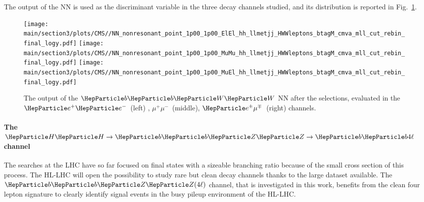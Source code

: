 The output of the NN is used as the discriminant variable in the three decay channels studied, and its distribution is reported in Fig.~\ref{sec3:CMSHH:fig:bbWW_events}.

\begin{figure}[!htb]
  \begin{center}
    \texttt{[image: \\main/section3/plots/CMS//NN\_nonresonant\_point\_1p00\_1p00\_ElEl\_hh\_llmetjj\_HWWleptons\_btagM\_cmva\_mll\_cut\_rebin\_final\_logy.pdf]}
    \texttt{[image: \\main/section3/plots/CMS//NN\_nonresonant\_point\_1p00\_1p00\_MuMu\_hh\_llmetjj\_HWWleptons\_btagM\_cmva\_mll\_cut\_rebin\_final\_logy.pdf]}
    \texttt{[image: \\main/section3/plots/CMS//NN\_nonresonant\_point\_1p00\_1p00\_MuEl\_hh\_llmetjj\_HWWleptons\_btagM\_cmva\_mll\_cut\_rebin\_final\_logy.pdf]}
    \caption{
      The output of the $\bbWW$ NN after the selections, evaluated in the
      $\Pe^{+}\Pe^{-}$~(left) , $\mu^{+}\mu^{-}$~(middle),
      $\Pe^{\pm}\mu^{\mp}$~(right) channels.
    }
    \label{sec3:CMSHH:fig:bbWW_events}
  \end{center}
\end{figure}


\paragraph{The $\HH\to\bbZZ\to \PQb\PQb 4\ell$ channel}

The \HH searches at the LHC have so far focused on final states with a sizeable branching ratio because of the small cross section of this process.
The HL-LHC will open the possibility to study rare but clean decay channels thanks to the large dataset available.
The $\bbZZ(4\ell)$ channel, that is investigated in this work, benefits from the clean four lepton signature to clearly identify signal events in the busy pileup environment of the HL-LHC.

